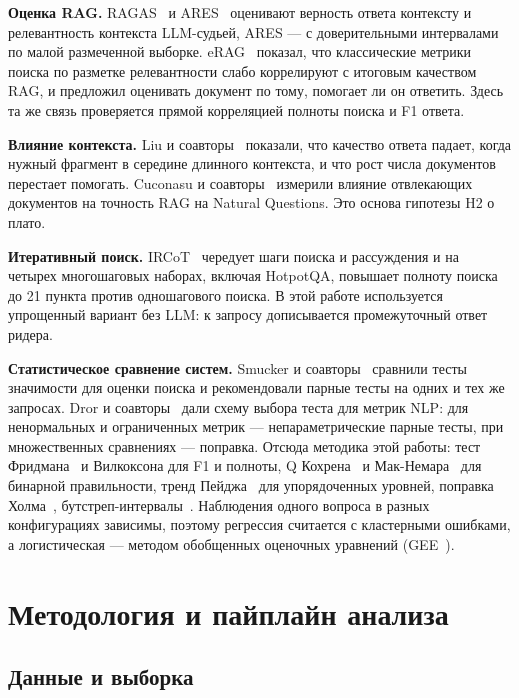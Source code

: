 \textbf{Оценка RAG.} RAGAS~\cite{ragas} и ARES~\cite{ares} оценивают верность ответа контексту и релевантность контекста LLM-судьей, ARES --- с доверительными интервалами по малой размеченной выборке. eRAG~\cite{erag} показал, что классические метрики поиска по разметке релевантности слабо коррелируют с итоговым качеством RAG, и предложил оценивать документ по тому, помогает ли он ответить. Здесь та же связь проверяется прямой корреляцией полноты поиска и F1 ответа.

\textbf{Влияние контекста.} Liu и соавторы~\cite{lostmiddle} показали, что качество ответа падает, когда нужный фрагмент в середине длинного контекста, и что рост числа документов перестает помогать. Cuconasu и соавторы~\cite{powernoise} измерили влияние отвлекающих документов на точность RAG на Natural Questions. Это основа гипотезы H2 о плато.

\textbf{Итеративный поиск.} IRCoT~\cite{ircot} чередует шаги поиска и рассуждения и на четырех многошаговых наборах, включая HotpotQA, повышает полноту поиска до 21 пункта против одношагового поиска. В этой работе используется упрощенный вариант без LLM: к запросу дописывается промежуточный ответ ридера.

\textbf{Статистическое сравнение систем.} Smucker и соавторы~\cite{smucker2007} сравнили тесты значимости для оценки поиска и рекомендовали парные тесты на одних и тех же запросах. Dror и соавторы~\cite{dror2018} дали схему выбора теста для метрик NLP: для ненормальных и ограниченных метрик --- непараметрические парные тесты, при множественных сравнениях --- поправка. Отсюда методика этой работы: тест Фридмана~\cite{friedman} и Вилкоксона для F1 и полноты, Q Кохрена~\cite{cochran} и Мак-Немара~\cite{mcnemar} для бинарной правильности, тренд Пейджа~\cite{page} для упорядоченных уровней, поправка Холма~\cite{holm}, бутстреп-интервалы~\cite{efron}. Наблюдения одного вопроса в разных конфигурациях зависимы, поэтому регрессия считается с кластерными ошибками, а логистическая --- методом обобщенных оценочных уравнений (GEE~\cite{gee}).

\section{Методология и пайплайн анализа}

\subsection{Данные и выборка}

